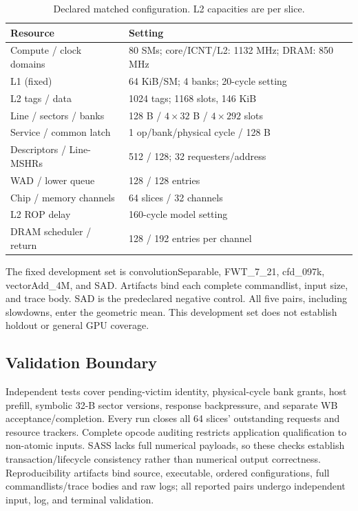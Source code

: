 \documentclass[conference,letterpaper]{IEEEtran}
\begin{document}
\begin{table}[t]
\caption{Declared matched configuration. L2 capacities are per slice.}
\label{tab:configuration}\centering\footnotesize
\begin{tabularx}{\columnwidth}{@{}L{.42\columnwidth}X@{}}
\toprule
Resource & Setting \\
\midrule
Compute / clock domains & 80 SMs; core/ICNT/L2: 1132 MHz; DRAM: 850 MHz \\
L1 (fixed) & 64 KiB/SM; 4 banks; 20-cycle setting \\
L2 tags / data & 1024 tags; 1168 slots, 146 KiB \\
Line / sectors / banks & 128 B / $4\times32$ B / $4\times292$ slots \\
Service / common latch & 1 op/bank/physical cycle / 128 B \\
Descriptors / Line-MSHRs & 512 / 128; 32 requesters/address \\
WAD / lower queue & 128 / 128 entries \\
Chip / memory channels & 64 slices / 32 channels \\
L2 ROP delay & 160-cycle model setting \\
DRAM scheduler / return & 128 / 192 entries per channel \\
\bottomrule
\end{tabularx}
\end{table}

The fixed development set is convolutionSeparable, FWT\_7\_21, cfd\_097k, vectorAdd\_4M, and SAD. Artifacts bind each complete commandlist, input size, and trace body. SAD is the predeclared negative control. All five pairs, including slowdowns, enter the geometric mean. This development set does not establish holdout or general GPU coverage.

\subsection{Validation Boundary}
Independent tests cover pending-victim identity, physical-cycle bank grants, host prefill, symbolic 32-B sector versions, response backpressure, and separate WB acceptance/completion. Every run closes all 64 slices' outstanding requests and resource trackers. Complete opcode auditing restricts application qualification to non-atomic inputs. SASS lacks full numerical payloads, so these checks establish transaction/lifecycle consistency rather than numerical output correctness. Reproducibility artifacts bind source, executable, ordered configurations, full commandlists/trace bodies and raw logs; all reported pairs undergo independent input, log, and terminal validation.
\end{document}
